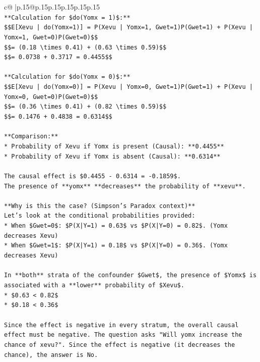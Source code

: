 \documentclass{article}
\begin{document}
{\begin{supertabular}{c@{$\;$}|p{.15\linewidth}@{}p{.15\linewidth}p{.15\linewidth}p{.15\linewidth}p{.15\linewidth}p{.15\linewidth}}
{{{\\ 
\texttt{**Calculation for \$do(Yomx = 1)\$:**} \\
\texttt{\$\$E{[}Xevu | do(Yomx=1){]} = P(Xevu | Yomx=1, Gwet=1)P(Gwet=1) + P(Xevu | Yomx=1, Gwet=0)P(Gwet=0)\$\$} \\
\texttt{\$\$= (0.18 \textbackslash{}times 0.41) + (0.63 \textbackslash{}times 0.59)\$\$} \\
\texttt{\$\$= 0.0738 + 0.3717 = 0.4455\$\$} \\
\\ 
\texttt{**Calculation for \$do(Yomx = 0)\$:**} \\
\texttt{\$\$E{[}Xevu | do(Yomx=0){]} = P(Xevu | Yomx=0, Gwet=1)P(Gwet=1) + P(Xevu | Yomx=0, Gwet=0)P(Gwet=0)\$\$} \\
\texttt{\$\$= (0.36 \textbackslash{}times 0.41) + (0.82 \textbackslash{}times 0.59)\$\$} \\
\texttt{\$\$= 0.1476 + 0.4838 = 0.6314\$\$} \\
\\ 
\texttt{**Comparison:**} \\
\texttt{*   Probability of Xevu if Yomx is present (Causal): **0.4455**} \\
\texttt{*   Probability of Xevu if Yomx is absent (Causal): **0.6314**} \\
\\ 
\texttt{The causal effect is \$0.4455 {-} 0.6314 = {-}0.1859\$.} \\
\texttt{The presence of **yomx** **decreases** the probability of **xevu**.} \\
\\ 
\texttt{**Why is this the case? (Simpson's Paradox context)**} \\
\texttt{Let's look at the conditional probabilities provided:} \\
\texttt{*   When \$Gwet=0\$: \$P(X|Y=1) = 0.63\$ vs \$P(X|Y=0) = 0.82\$. (Yomx decreases Xevu)} \\
\texttt{*   When \$Gwet=1\$: \$P(X|Y=1) = 0.18\$ vs \$P(X|Y=0) = 0.36\$. (Yomx decreases Xevu)} \\
\\ 
\texttt{In **both** strata of the confounder \$Gwet\$, the presence of \$Yomx\$ is associated with a **lower** probability of \$Xevu\$.} \\
\texttt{*   \$0.63 < 0.82\$} \\
\texttt{*   \$0.18 < 0.36\$} \\
\\ 
\texttt{Since the effect is negative in every stratum, the overall causal effect must be negative. The question asks "Will yomx increase the chance of xevu?". Since the effect is negative (it decreases the chance), the answer is No.} \\
}}}
\end{supertabular}}
\end{document}

